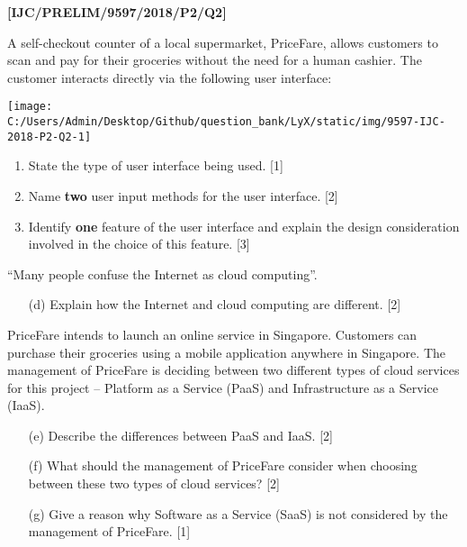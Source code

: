 \item \textbf{{[}IJC/PRELIM/9597/2018/P2/Q2{]} }

A self-checkout counter of a local supermarket, PriceFare, allows
customers to scan and pay for their groceries without the need for
a human cashier. The customer interacts directly via the following
user interface:
\begin{center}
\texttt{[image: C:/Users/Admin/Desktop/Github/question\_bank/LyX/static/img/9597-IJC-2018-P2-Q2-1]}
\par\end{center}
\begin{enumerate}
\item State the type of user interface being used. \hfill{}{[}1{]}
\item Name \textbf{two} user input methods for the user interface. \hfill{}
{[}2{]}
\item Identify \textbf{one} feature of the user interface and explain the
design consideration involved in the choice of this feature. \hfill{}{[}3{]}
\end{enumerate}
\textquotedblleft Many people confuse the Internet as cloud computing\textquotedblright .
\begin{enumerate}
\item[(d)]  Explain how the Internet and cloud computing are different. \hfill{}{[}2{]}
\end{enumerate}
PriceFare intends to launch an online service in Singapore. Customers
can purchase their groceries using a mobile application anywhere in
Singapore. The management of PriceFare is deciding between two different
types of cloud services for this project -- Platform as a Service
(PaaS) and Infrastructure as a Service (IaaS). 
\begin{enumerate}
\item[(e)]  Describe the differences between PaaS and IaaS. \hfill{} {[}2{]}
\item[(f)]  What should the management of PriceFare consider when choosing between
these two types of cloud services? \hfill{}{[}2{]}
\item[(g)]  Give a reason why Software as a Service (SaaS) is not considered
by the management of PriceFare. \hfill{} {[}1{]}
\end{enumerate}